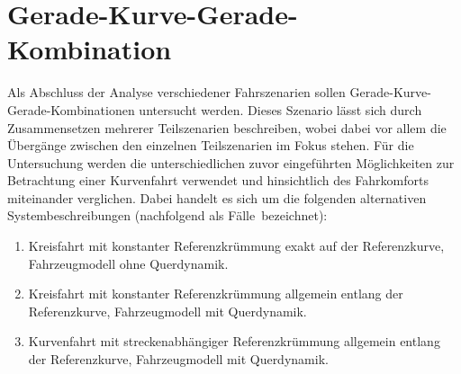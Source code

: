 \section{Gerade-Kurve-Gerade-Kombination}
Als Abschluss der Analyse verschiedener Fahrszenarien sollen Gerade-Kurve-Gerade-Kombinationen untersucht werden. Dieses Szenario lässt sich durch Zusammensetzen mehrerer Teilszenarien beschreiben, wobei dabei vor allem die Übergänge zwischen den einzelnen Teilszenarien im Fokus stehen. Für die Untersuchung werden die unterschiedlichen zuvor eingeführten Möglichkeiten zur Betrachtung einer Kurvenfahrt verwendet und hinsichtlich des Fahrkomforts miteinander verglichen. Dabei handelt es sich um die folgenden alternativen Systembeschreibungen (nachfolgend als \glqq Fälle\grqq~bezeichnet): 
\begin{enumerate}
	\item Kreisfahrt mit konstanter Referenzkrümmung exakt auf der Referenzkurve, Fahrzeugmodell ohne Querdynamik.
	\item Kreisfahrt mit konstanter Referenzkrümmung allgemein entlang der Referenzkurve, Fahrzeugmodell mit Querdynamik.
	\item Kurvenfahrt mit streckenabhängiger Referenzkrümmung allgemein entlang der Referenzkurve, Fahrzeugmodell mit Querdynamik.
\end{enumerate}
